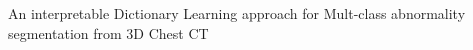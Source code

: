 ﻿
\thispagestyle{empty}

\begin{center}

\begin{huge}
An interpretable Dictionary Learning approach for Mult-class abnormality segmentation from 3D Chest CT
\end{huge} \\
\vspace{1cm}

\end{center}


